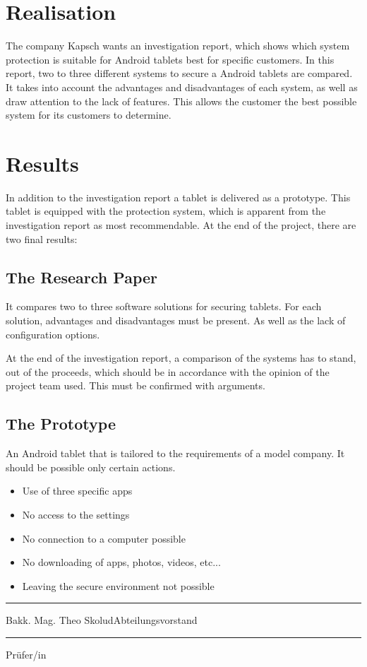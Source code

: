 \section*{Realisation}
The company Kapsch wants an investigation report, which shows which system protection is suitable for Android tablets best for specific customers. In this report, two to three different systems to secure a Android tablets are compared. It takes into account the advantages and disadvantages of each system, as well as draw attention to the lack of features. This allows the customer the best possible system for its customers to determine.
\section*{Results}
In addition to the investigation report a tablet is delivered as a prototype. This tablet is equipped with the protection system, which is apparent from the investigation report as most recommendable.
\newline At the end of the project, there are two final results:
\subsection*{The Research Paper}
It compares two to three software solutions for securing tablets. For each solution, advantages and disadvantages must be present. As well as the lack of configuration options.

At the end of the investigation report, a comparison of the systems has to stand, out of the proceeds, which should be in accordance with the opinion of the project team used. This must be confirmed with arguments.
\newpage
\subsection*{The Prototype}
An Android tablet that is tailored to the requirements of a model company. It should be possible only certain actions.
\begin{itemize}
	\item Use of three specific apps
	\item No access to the settings
	\item No connection to a computer possible
	\item No downloading of apps, photos, videos, etc...
	\item Leaving the secure environment not possible
\end{itemize}

\noindent
\par
\vspace{20mm}
\noindent

\parbox{5cm}{\centering\hrule\medskip Bakk. Mag. Theo Skolud\newline Abteilungsvorstand}

\noindent
\par
\vspace{20mm}
\noindent

\parbox{5cm}{\centering\hrule\medskip Prüfer/in}
